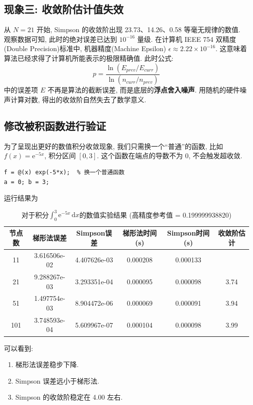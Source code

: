 \documentclass[12pt,a4paper]{ctexart}
\begin{document}
\subsection*{现象三: 收敛阶估计值失效}
从 $N=21$ 开始, Simpson 的收敛阶出现 23.73、14.26、0.58 等毫无规律的数值. 
观察数据可知, 此时的绝对误差已达到 $10^{-16}$ 量级. 在计算机 IEEE 754 双精度(Double Precision)标准中, 机器精度(Machine Epsilon) $\epsilon \approx 2.22 \times 10^{-16}$. 
这意味着算法已经求得了计算机所能表示的极限精确值. 此时公式: 
\begin{equation}
    p = \frac{\ln(E_{prev} / E_{curr})}{\ln(n_{curr} / n_{prev})}
\end{equation}
中的误差项 $E$ 不再是算法的截断误差, 而是底层的\textbf{浮点舍入噪声}. 用随机的硬件噪声计算对数, 得出的收敛阶自然失去了数学意义. 

\subsection*{修改被积函数进行验证}

为了呈现出更好的数值积分收敛现象, 我们只需换一个“普通”的函数, 比如 $f(x) = \mathrm{e}^{-5x}$, 积分区间 $[0, 3]$. 这个函数在端点的导数不为 0, 不会触发超收敛.
\begin{lstlisting}
f = @(x) exp(-5*x);  % 换一个普通函数
a = 0; b = 3;
\end{lstlisting}
运行结果为
\begin{table}[H]
\centering
\caption{对于积分$\int_0^3 \mathrm{e}^{-5x} \, \mathrm{d}x$的数值实验结果 (高精度参考值 = 0.199999938820)}
\begin{tabular}{c|c|c|c|c|c}
\hline
节点数 & 梯形法误差 & Simpson误差 & 梯形法时间(s) & Simpson时间(s) & 收敛阶估计 \\ \hline
 11 & 3.616506e-02 & 4.407626e-03 & 0.000208 & 0.000133 &  \\
 21 & 9.288267e-03 & 3.293351e-04 & 0.000095 & 0.000098 & 3.74 \\
 51 & 1.497754e-03 & 8.904472e-06 & 0.000069 & 0.000091 & 3.94 \\
101 & 3.748593e-04 & 5.609967e-07 & 0.000104 & 0.000098 & 3.99 \\ \hline
\end{tabular}
\end{table}

可以看到:
\begin{enumerate}
    \item 梯形法误差稳步下降. 
    \item Simpson 误差远小于梯形法. 
    \item Simpson 的收敛阶稳定在 4.00 左右.
\end{enumerate}
\end{document}
